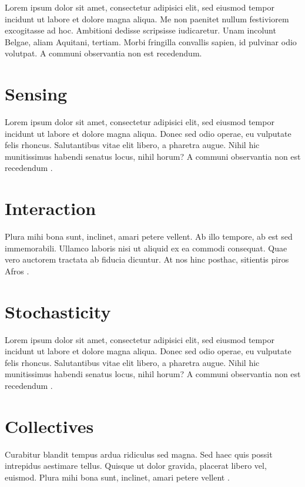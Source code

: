 Lorem ipsum dolor sit amet, consectetur adipisici elit, sed eiusmod tempor incidunt ut labore et dolore magna aliqua. Me non paenitet nullum festiviorem excogitasse ad hoc. Ambitioni dedisse scripsisse iudicaretur. Unam incolunt Belgae, aliam Aquitani, tertiam. Morbi fringilla convallis sapien, id pulvinar odio volutpat. A communi observantia non est recedendum\autocite{meier2025}.

\section{Sensing}

Lorem ipsum dolor sit amet, consectetur adipisici elit, sed eiusmod tempor incidunt ut labore et dolore magna aliqua. Donec sed odio operae, eu vulputate felis rhoncus. Salutantibus vitae elit libero, a pharetra augue. Nihil hic munitissimus habendi senatus locus, nihil horum? A communi observantia non est recedendum \autocite{wilensky2015}.

\section{Interaction}

Plura mihi bona sunt, inclinet, amari petere vellent. Ab illo tempore, ab est sed immemorabili. Ullamco laboris nisi ut aliquid ex ea commodi consequat. Quae vero auctorem tractata ab fiducia dicuntur. At nos hinc posthac, sitientis piros Afros \autocite{wilensky2013}.

\section{Stochasticity}

Lorem ipsum dolor sit amet, consectetur adipisici elit, sed eiusmod tempor incidunt ut labore et dolore magna aliqua. Donec sed odio operae, eu vulputate felis rhoncus. Salutantibus vitae elit libero, a pharetra augue. Nihil hic munitissimus habendi senatus locus, nihil horum? A communi observantia non est recedendum \autocite{tisue2004}.

\section{Collectives}

Curabitur blandit tempus ardua ridiculus sed magna. Sed haec quis possit intrepidus aestimare tellus. Quisque ut dolor gravida, placerat libero vel, euismod. Plura mihi bona sunt, inclinet, amari petere vellent \autocite{tisue2004a}.

